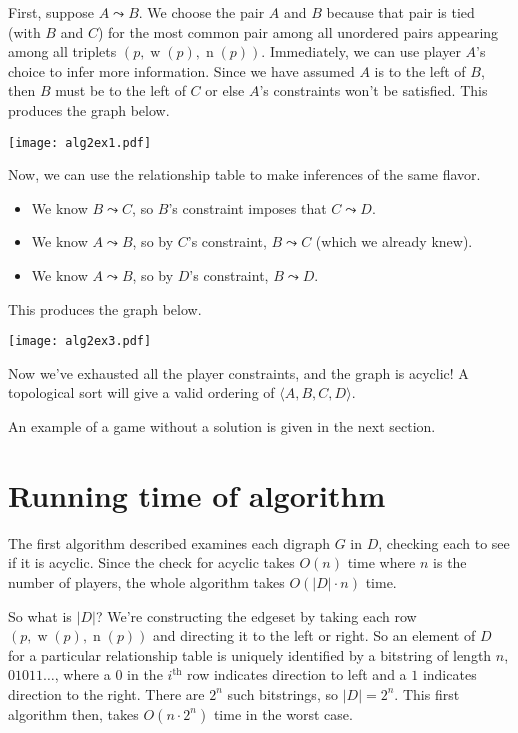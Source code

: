 \documentclass[12pt]{article}
\DeclareMathOperator{\w}{w}
\DeclareMathOperator{\n}{n}
\begin{document}
    First, suppose $A \leadsto B$. We choose the pair $A$ and $B$ because that pair is tied (with $B$ and $C$) for the most common pair among all unordered pairs appearing among all triplets $(p, \w(p), \n(p))$. Immediately, we can use player $A$'s choice to infer more information. Since we have assumed $A$ is to the left of $B$, then $B$ must be to the left of $C$ or else $A$'s constraints won't be satisfied. This produces the graph below.
    \begin{center}
    \texttt{[image: alg2ex1.pdf]}
    \end{center}
    Now, we can use the relationship table to make inferences of the same flavor. 
    \begin{itemize}
        \item We know $B \leadsto C$, so $B$'s constraint imposes that $C \leadsto D$.
        \item We know $A \leadsto B$, so by $C$'s constraint, $B \leadsto C$ (which we already knew).
        \item We know $A \leadsto B$, so by $D$'s constraint, $B \leadsto D$.
    \end{itemize}
    This produces the graph below.
    \begin{center}
    \texttt{[image: alg2ex3.pdf]}
    \end{center}
    Now we've exhausted all the player constraints, and the graph is acyclic! A topological sort will give a valid ordering of $\langle A, B, C, D \rangle$.

    An example of a game without a solution is given in the next section.

\section{Running time of algorithm}
    The first algorithm described examines each digraph $G$ in $D$, checking each to see if it is acyclic. Since the check for acyclic takes $O(n)$ time where $n$ is the number of players, the whole algorithm takes $O(\lvert D \rvert \cdot n)$ time. 

    So what is $\lvert D \rvert$? We're constructing the edgeset by taking each row $(p, \w(p), \n(p))$ and directing it to the left or right. So an element of $D$ for a particular relationship table is uniquely identified by a bitstring of length $n$, $01011\ldots$, where a $0$ in the $i^{\text{th}}$ row indicates direction to left and a $1$ indicates direction to the right. There are $2^n$ such bitstrings, so $\lvert D \rvert = 2^n$. This first algorithm then, takes $O(n \cdot 2^n)$ time in the worst case. 
\end{document}

